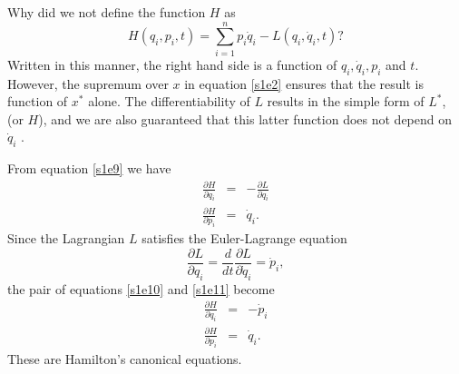 \documentclass{article}
\numberwithin{equation}{section}
\theoremstyle{plain}
\numberwithin{thm}{section}
\theoremstyle{plain}
\numberwithin{prop}{section}
\theoremstyle{definition}
\numberwithin{defn}{section}
\theoremstyle{remark}
\begin{document}
Why did we not define the function $H$ as
\begin{equation}\label{s1e9}
H(q_i, p_i, t) = \sum_{i=1}^n p_i\dot{q}_i - L(q_i, \dot{q}_i, t)?
\end{equation}
Written in this manner, the right hand side is a function of $q_i, \dot{q}_i,
p_i$ and $t$. However, the supremum over $x$ in equation \eqref{s1e2} ensures
that the result is function of $x^\ast$ alone. The differentiability of $L$
results in the simple form of $L^\ast$, (or $H$), and we are also guaranteed
that this latter function does not depend on $\dot{q}_i$
\cite{touchette2005legendre}. 

From equation \eqref{s1e9} we have
\begin{eqnarray}
\frac{\partial{H}}{\partial q_i} &=& 
  -\frac{\partial L}{\partial q_i} \label{s1e10} \\
\frac{\partial{H}}{\partial p_i} &=& \dot{q}_i \label{s1e11}.
\end{eqnarray}
Since the Lagrangian $L$ satisfies the Euler-Lagrange equation
\begin{equation}\label{s1e12}
\frac{\partial L}{\partial q_i} = \frac{d}{dt}
\frac{\partial L}{\partial\dot{q}_i} = \dot{p}_i,
\end{equation}
the pair of equations \eqref{s1e10} and \eqref{s1e11} become
\begin{eqnarray}
\frac{\partial{H}}{\partial q_i} &=& -\dot{p}_i \label{s1e13} \\
\frac{\partial{H}}{\partial p_i} &=& \dot{q}_i. \label{s1e14}
\end{eqnarray}
These are Hamilton's canonical equations.
\end{document}
